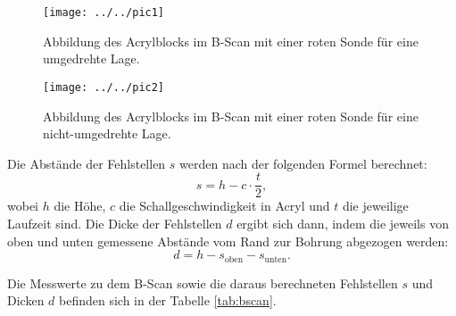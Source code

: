 \begin{figure}[h!]
	\centering
	\texttt{[image: ../../pic1]}
	\caption{Abbildung des Acrylblocks im B-Scan mit einer roten Sonde für eine umgedrehte Lage.}
	\label{fig:pic1}
\end{figure}

\begin{figure}[h!]
	\centering
	\texttt{[image: ../../pic2]}
	\caption{Abbildung des Acrylblocks im B-Scan mit einer roten Sonde für eine nicht-umgedrehte Lage.}
	\label{fig:pic2}
\end{figure}
 
Die Abstände der Fehlstellen $s$ werden nach der folgenden Formel berechnet:
\begin{equation}
s = h - c \cdot \frac{t}{2},
\end{equation}
wobei $h$ die Höhe, $c$ die Schallgeschwindigkeit in Acryl und $t$ die jeweilige Laufzeit sind. Die Dicke der Fehlstellen $d$ ergibt sich dann, indem die jeweils von oben und unten gemessene Abstände vom Rand zur Bohrung abgezogen werden:
\begin{equation}
d = h - s_\text{oben} - s_\text{unten}.
\end{equation}

 Die Messwerte zu dem B-Scan sowie die daraus berechneten Fehlstellen $s$ und Dicken $d$ befinden sich in der Tabelle \ref{tab:bscan}. 

